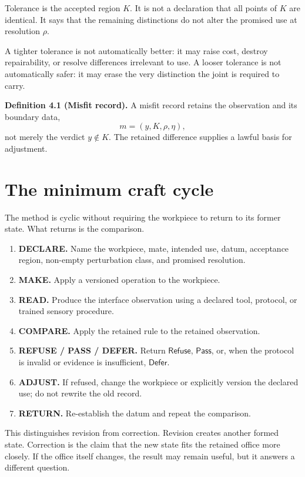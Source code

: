 \documentclass[11pt]{article}
\newcommand{\Pass}{\mathsf{Pass}}
\newcommand{\Refuse}{\mathsf{Refuse}}
\newcommand{\Defer}{\mathsf{Defer}}
\begin{document}
Tolerance is the accepted region $K$. It is not a declaration that all points of $K$ are identical. It says that the remaining distinctions do not alter the promised use at resolution $\rho$.

A tighter tolerance is not automatically better: it may raise cost, destroy repairability, or resolve differences irrelevant to use. A looser tolerance is not automatically safer: it may erase the very distinction the joint is required to carry.

\textbf{Definition 4.1 (Misfit record).}
A misfit record retains the observation and its boundary data,
\[
m=(y,K,\rho,\eta),
\]
not merely the verdict $y\notin K$. The retained difference supplies a lawful basis for adjustment.

\section{The minimum craft cycle}

The method is cyclic without requiring the workpiece to return to its former state. What returns is the comparison.

\begin{enumerate}[label=\roman*.]
\item \textbf{DECLARE.} Name the workpiece, mate, intended use, datum, acceptance region, non-empty perturbation class, and promised resolution.
\item \textbf{MAKE.} Apply a versioned operation to the workpiece.
\item \textbf{READ.} Produce the interface observation using a declared tool, protocol, or trained sensory procedure.
\item \textbf{COMPARE.} Apply the retained rule to the retained observation.
\item \textbf{REFUSE / PASS / DEFER.} Return $\Refuse$, $\Pass$, or, when the protocol is invalid or evidence is insufficient, $\Defer$.
\item \textbf{ADJUST.} If refused, change the workpiece or explicitly version the declared use; do not rewrite the old record.
\item \textbf{RETURN.} Re-establish the datum and repeat the comparison.
\end{enumerate}

This distinguishes revision from correction. Revision creates another formed state. Correction is the claim that the new state fits the retained office more closely. If the office itself changes, the result may remain useful, but it answers a different question.
\end{document}
